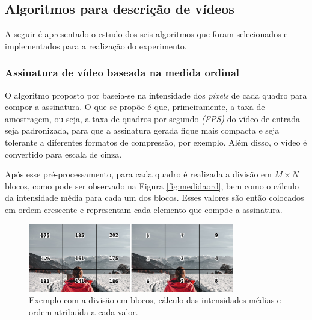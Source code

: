 \subsection{Algoritmos para descrição de vídeos}
	A seguir é apresentado o estudo dos seis algoritmos que foram selecionados e implementados para a realização do experimento.


%
%
\subsubsection{Assinatura de vídeo baseada na medida ordinal}
\label{sec:med_ordinal}

	O algoritmo proposto por \citeauthor{hua2004robust} baseia-se na intensidade dos \textit{pixels} de cada quadro para compor a assinatura. O que se propõe é que, primeiramente, a taxa de amostragem, ou seja, a taxa de quadros por segundo \textit{(FPS)} do vídeo de entrada seja padronizada, para que a assinatura gerada fique mais compacta e seja tolerante a diferentes formatos de compressão, por exemplo. Além disso, o vídeo é convertido para escala de cinza.

Após esse pré-processamento, para cada quadro é realizada a divisão em $M \times N$ blocos, como pode ser observado na Figura \ref{fig:medidaord}, bem como o cálculo da intensidade média para cada um dos blocos. Esses valores são então colocados em ordem crescente e representam cada elemento que compõe a assinatura.

	\begin{figure}[h]
        \centering
        \includegraphics[width=0.8\textwidth]{dados/figuras/mo_final.png}
        \caption{Exemplo com a divisão em blocos, cálculo das intensidades médias e ordem atribuída a cada valor.}
    \end{figure}

